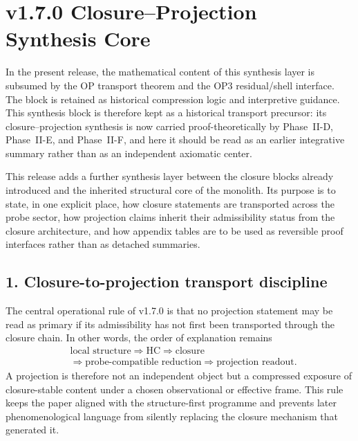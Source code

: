 \section*{v1.7.0 Closure--Projection Synthesis Core}

\begin{remark}
\label{rem:normalization-note-v170}
In the present release, the mathematical content of this synthesis layer is subsumed by the OP transport theorem and the OP3 residual/shell interface. The block is retained as historical compression logic and interpretive guidance. This synthesis block is therefore kept as a historical transport precursor: its closure--projection synthesis is now carried proof-theoretically by Phase~II-D, Phase~II-E, and Phase~II-F, and here it should be read as an earlier integrative summary rather than as an independent axiomatic center.
\end{remark}

This release adds a further synthesis layer between the closure blocks already
introduced and the inherited structural core of the monolith. Its purpose is to
state, in one explicit place, how closure statements are transported across the
probe sector, how projection claims inherit their admissibility status from the
closure architecture, and how appendix tables are to be used as reversible proof
interfaces rather than as detached summaries.

\subsection*{1. Closure-to-projection transport discipline}
The central operational rule of v1.7.0 is that no projection statement may be
read as primary if its admissibility has not first been transported through the
closure chain. In other words, the order of explanation remains
\[
\begin{aligned}
&\text{local structure}
\Longrightarrow \text{HC}
\Longrightarrow \text{closure}\\[0.15em]
&\Longrightarrow \text{probe-compatible reduction}
\Longrightarrow \text{projection readout}.
\end{aligned}
\]
A projection is therefore not an independent object but a compressed exposure of
closure-stable content under a chosen observational or effective frame. This
rule keeps the paper aligned with the structure-first programme and prevents
later phenomenological language from silently replacing the closure mechanism
that generated it.

